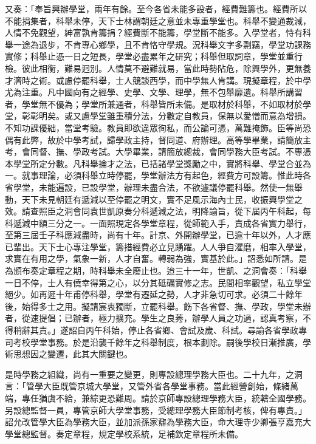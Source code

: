 \begin{pinyinscope}
又奏：「奉旨興辦學堂，兩年有餘。至今各省未能多設者，經費難籌也。經費所以不能捐集者，科舉未停，天下士林謂朝廷之意並未專重學堂也。科舉不變通裁減，人情不免觀望，紳富孰肯籌捐？經費斷不能籌，學堂斷不能多。入學堂者，恃有科舉一途為退步，不肯專心鄉學，且不肯恪守學規。況科舉文字多剽竊，學堂功課務實修；科舉止憑一日之短長，學堂必盡累年之研究；科舉但取詞章，學堂並重行檢。彼此相衡，難易迥別。人情莫不避難就易，當此時勢阽危，除興學外，更無養才濟時之術。或慮停罷科舉，士人競談西學，而中學無人肯講。現擬章程，於中學尤為注重。凡中國向有之經學、史學、文學、理學，無不包舉靡遺。科舉所講習者，學堂無不優為；學堂所兼通者，科舉皆所未備。是取材於科舉，不如取材於學堂，彰彰明矣。或又慮學堂雖重積分法，分數定自教員，保無以愛憎而意為增損。不知功課優絀，當堂考驗。教員即欲違眾徇私，而公論可憑，萬難掩飾。臣等尚恐偶有此弊，故於中學考試，歸學政主持，督同道、府辦理。高等學畢業，請簡放主考，會同督、撫、學政考試。大學畢業，請簡放總裁，會同學務大臣考試。不專憑本學堂所定分數。凡科舉掄才之法，已括諸學堂獎勵之中，實將科舉、學堂合並為一。就事理論，必須科舉立時停罷，學堂辦法方有起色，經費方可設籌。惟此時各省學堂，未能遍設，已設學堂，辦理未盡合法，不欲遽議停罷科舉。然使一無舉動，天下未見朝廷有遞減以至停罷之明文，實不足風示海內士民，收振興學堂之效。請查照臣之洞會同袁世凱原奏分科遞減之法，明降諭旨，從下屆丙午科起，每科遞減中額三分之一。一面照現定各學堂章程，從師範入手，責成各省實力舉行，至第三屆壬子科應減盡時，尚有十年。計京、外開辦學堂，已逾十年以外，人才應已輩出。天下士心專注學堂，籌措經費必立見踴躍。人人爭自濯磨，相率入學堂，求實在有用之學，氣象一新，人才自奮。轉弱為強，實基於此。」詔悉如所請。是為頒布奏定章程之期，時科舉未全廢止也。迨三十一年，世凱、之洞會奏：「科舉一日不停，士人有僥幸得第之心，以分其砥礪實修之志。民間相率觀望，私立學堂絕少。如再遲十年甫停科舉，學堂有遷延之勢，人才非急切可求。必須二十餘年後，始得多士之用。擬請宸衷獨斷，立罷科舉。飭下各省督、撫、學政，學堂未辦者，從速提倡；已辦者，極力擴充。學生之良莠，辦學人員之功過，認真考察，不得稍辭其責。」遂詔自丙午科始，停止各省鄉、會試及歲、科試。尋諭各省學政專司考校學堂事務。於是沿襲千餘年之科舉制度，根本劃除。嗣後學校日漸推廣，學術思想因之變遷，此其大關鍵也。

是時學務之組織，尚有一重要之變更，則專設總理學務大臣也。二十九年，之洞言：「管學大臣既管京城大學堂，又管外省各學堂事務。當此經營創始，條緒萬端，專任猶虞不給，兼綜更恐難周。請於京師專設總理學務大臣，統轄全國學務。另設總監督一員，專管京師大學堂事務，受總理學務大臣節制考核，俾有專責。」詔允改管學大臣為學務大臣，並加派孫家鼐為學務大臣，命大理寺少卿張亨嘉充大學堂總監督。奏定章程，規定學校系統，足補欽定章程所未備。


\end{pinyinscope}
